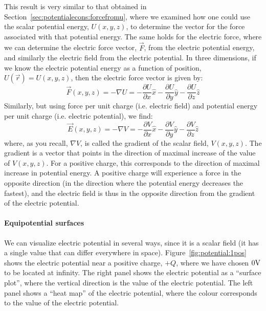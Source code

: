 This result is very similar to that obtained in Section~\ref{sec:potentialecons:forcefromu}, where we examined how one could use the scalar potential energy, $U(x,y,z)$, to determine the vector for the force associated with that potential energy. The same holds for the electric force, where we can determine the electric force vector, $\vec F$, from the electric potential energy, and similarly the electric field from the electric potential. In three dimensions, if we know the electric potential energy as a function of position, $U(\vec r)=U(x,y,z)$, then the electric force vector is given by:
\begin{equation}
\vec F(x,y,z) =- \nabla U=-\frac{\partial U}{\partial x}\hat x-\frac{\partial U}{\partial y}\hat y-\frac{\partial U}{\partial z}\hat z
\end{equation}
Similarly, but using force per unit charge (i.e. electric field) and potential energy per unit charge (i.e. electric potential), we find:
\begin{equation}
\vec E(x,y,z) = -\nabla V =-\frac{\partial V}{\partial x}\hat x-\frac{\partial V}{\partial y}\hat y-\frac{\partial V}{\partial z}\hat z
\end{equation}
where, as you recall, $\nabla V$, is called the gradient of the scalar field, $V(x,y,z)$. The gradient is a vector that points in the direction of maximal increase of the value of $V(x,y,z)$. For a positive charge, this corresponds to the direction of maximal increase in potential energy. A positive charge will experience a force in the opposite direction (in the direction where the potential energy decreases the fastest), and the electric field is thus in the opposite direction from the gradient of the electric potential.

\paragraph{Equipotential surfaces}

We can visualize electric potential in several ways, since it is a scalar field (it has a single value that can differ everywhere in space). Figure~\ref{fig:potential:1pos} shows the electric potential near a positive charge, $+Q$, where we have chosen $0 {\rm V}$ to be located at infinity. The right panel shows the electric potential as a ``surface plot'', where the vertical direction is the value of the electric potential. The left panel shows a ``heat map'' of the electric potential, where the colour corresponds to the value of the electric potential.

